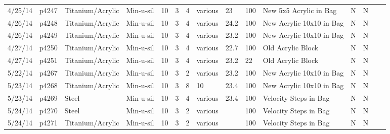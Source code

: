 \begin{landscape}
\begin{longtable}{lllllllllllllll}
4/25/14  & p4247      & Titanium/Acrylic & Min-u-sil    & 10           & 3         & 4             & various                      & 23          & 100      & New 5x5 Acrylic in Bag                          & N     & N    &  &  \\
4/26/14  & p4248      & Titanium/Acrylic & Min-u-sil    & 10           & 3         & 4             & various                      & 24.2        & 100      & New Acrylic 10x10 in Bag                        & N     & N    &  &  \\
4/26/14  & p4249      & Titanium/Acrylic & Min-u-sil    & 10           & 3         & 4             & various                      & 23.2        & 100      & New Acrylic 10x10 in Bag                        & N     & N    &  &  \\
4/27/14  & p4250      & Titanium/Acrylic & Min-u-sil    & 10           & 3         & 4             & various                      & 22.7        & 100      & Old Acrylic Block                               & N     & N    &  &  \\
4/27/14  & p4251      & Titanium/Acrylic & Min-u-sil    & 10           & 3         & 4             & various                      & 23.2        & 22       & Old Acrylic Block                               & N     & N    &  &  \\
5/22/14  & p4267      & Titanium/Acrylic & Min-u-sil    & 10           & 3         & 2             & various                      & 23.2        & 100      & New Acrylic 10x10 in Bag                        & N     & N    &  &  \\
5/23/14  & p4268      & Titanium/Acrylic & Min-u-sil    & 10           & 3         & 8             & 10                           & 23.4        & 100      & New Acrylic 10x10 in Bag                        & N     & N    &  &  \\
5/23/14  & p4269      & Steel            & Min-u-sil    & 10           & 3         & 4             & various                      & 23.4        & 100      & Velocity Steps in Bag                           & N     & N    &  &  \\
5/24/14  & p4270      & Steel            & Min-u-sil    & 10           & 3         & 2             & various                      &             & 100      & Velocity Steps in Bag                           & N     & N    &  &  \\
5/24/14  & p4271      & Titanium/Acrylic & Min-u-sil    & 10           & 3         & 2             & various                      &             & 100      & Velocity Steps in Bag                           & N     & N    &  &  \\

\end{longtable}
\end{landscape}
